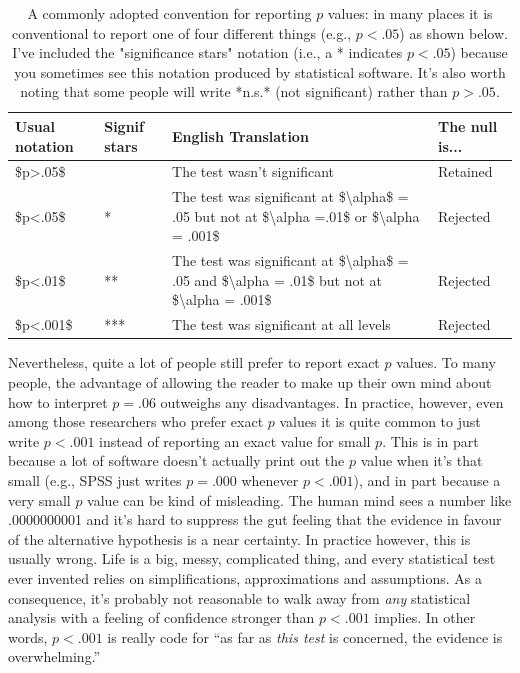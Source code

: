 \documentclass[
]{book}
\begin{document}
\begin{table}

\caption{\label{tab:pvaltable}A commonly adopted convention for reporting $p$ values: in many places it is conventional to report one of four different things (e.g., $p<.05$) as shown below. I've included the "significance stars" notation (i.e., a * indicates $p<.05$) because you sometimes see this notation produced by statistical software. It's also worth noting that some people will write *n.s.* (not significant) rather than $p>.05$.}
\centering
\begin{tabular}[t]{l|l|l|l}
\hline
Usual notation & Signif stars & English Translation & The null is...\\
\hline
\$p>.05\$ &  & The test wasn't significant & Retained\\
\hline
\$p<.05\$ & * & The test was significant at \$\textbackslash{}alpha\$ = .05 but not at  \$\textbackslash{}alpha =.01\$ or \$\textbackslash{}alpha = .001\$ & Rejected\\
\hline
\$p<.01\$ & ** & The test was significant at \$\textbackslash{}alpha\$ = .05  and \$\textbackslash{}alpha = .01\$ but not at  \$\textbackslash{}alpha = .001\$ & Rejected\\
\hline
\$p<.001\$ & *** & The test was significant at all levels & Rejected\\
\hline
\end{tabular}
\end{table}

Nevertheless, quite a lot of people still prefer to report exact \(p\) values. To many people, the advantage of allowing the reader to make up their own mind about how to interpret \(p = .06\) outweighs any disadvantages. In practice, however, even among those researchers who prefer exact \(p\) values it is quite common to just write \(p<.001\) instead of reporting an exact value for small \(p\). This is in part because a lot of software doesn't actually print out the \(p\) value when it's that small (e.g., SPSS just writes \(p = .000\) whenever \(p<.001\)), and in part because a very small \(p\) value can be kind of misleading. The human mind sees a number like .0000000001 and it's hard to suppress the gut feeling that the evidence in favour of the alternative hypothesis is a near certainty. In practice however, this is usually wrong. Life is a big, messy, complicated thing, and every statistical test ever invented relies on simplifications, approximations and assumptions. As a consequence, it's probably not reasonable to walk away from \emph{any} statistical analysis with a feeling of confidence stronger than \(p<.001\) implies. In other words, \(p<.001\) is really code for ``as far as \emph{this test} is concerned, the evidence is overwhelming.''
\end{document}
